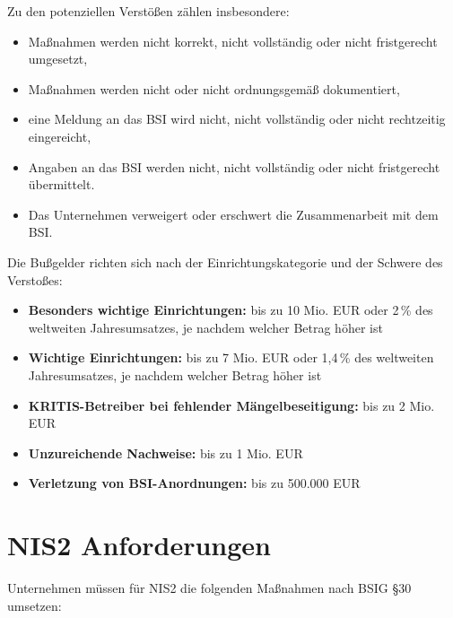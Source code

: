 Zu den potenziellen Verstößen zählen insbesondere:
\begin{itemize}
    \item Maßnahmen werden nicht korrekt, nicht vollständig oder nicht fristgerecht umgesetzt,
    \item Maßnahmen werden nicht oder nicht ordnungsgemäß dokumentiert,
    \item eine Meldung an das BSI wird nicht, nicht vollständig oder nicht rechtzeitig eingereicht,
    \item Angaben an das BSI werden nicht, nicht vollständig oder nicht fristgerecht übermittelt.
    \item Das Unternehmen verweigert oder erschwert die Zusammenarbeit mit dem BSI.
\end{itemize}

Die Bußgelder richten sich nach der Einrichtungskategorie und der Schwere des Verstoßes:
\begin{itemize}
    \item \textbf{Besonders wichtige Einrichtungen:} bis zu 10 Mio. EUR oder 2\,\% des weltweiten Jahresumsatzes, je nachdem welcher Betrag höher ist
    \item \textbf{Wichtige Einrichtungen:} bis zu 7 Mio. EUR oder 1,4\,\% des weltweiten Jahresumsatzes, je nachdem welcher Betrag höher ist
    \item \textbf{KRITIS-Betreiber bei fehlender Mängelbeseitigung:} bis zu 2 Mio. EUR
    \item \textbf{Unzureichende Nachweise:} bis zu 1 Mio. EUR
    \item \textbf{Verletzung von BSI-Anordnungen:} bis zu 500.000 EUR
\end{itemize}

\newpage
\section{NIS2 Anforderungen}

Unternehmen müssen für NIS2 die folgenden Maßnahmen nach BSIG §30 umsetzen:

